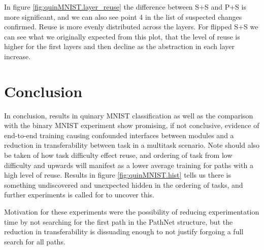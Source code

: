 In figure \ref{fig:quinMNIST.layer_reuse} the difference between S+S and P+S is more significant, and we can also see point 4 in the list of suspected changes confirmed. Reuse is more evenly distributed across the layers. For flipped S+S we can see what we originally expected from this plot, that the level of reuse is higher for the first layers and then decline as the abstraction in each layer increase. 

\section{Conclusion}
In conclusion, results in quinary MNIST classification as well as the comparison with the binary MNIST experiment show promising, if not conclusive, evidence of end-to-end training causing confounded interfaces between modules and a reduction in transferability between task in a multitask scenario. Note should also be taken of how task difficulty effect reuse, and ordering of task from low difficulty and upwards will manifest as a lower average training for paths with a high level of reuse. Results in figure \ref{fig:quinMNIST.hist} tells us there is something undiscovered and unexpected hidden in the ordering of tasks, and further experiments is called for to  uncover this. 

Motivation for these experiments were the possibility of reducing experimentation time by not searching for the first path in the PathNet structure, but the reduction in transferability is dissuading enough to not justify forgoing a full search for all paths. 

